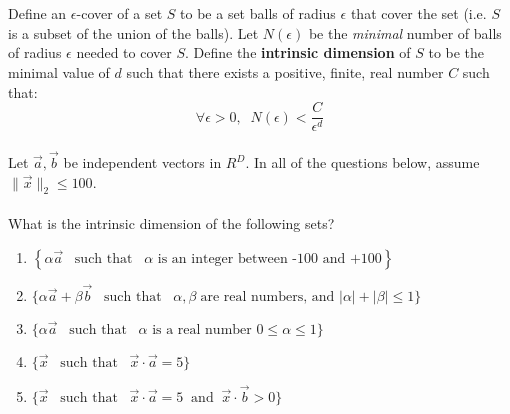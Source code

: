 \documentclass[10pt]{article}
\begin{document}
\newcommand{\uu}{\vec{u}}
\newcommand{\xx}{\vec{x}}
\newcommand{\yy}{\vec{y}}
\newcommand{\vmu}{\vec{\mu}}
~\\
~\\
\noindent
   Define an $\epsilon$-cover of a set
    $S$ to be a set balls of radius $\epsilon$ that
    cover the set (i.e. $S$ is a subset of the union of the
    balls). Let $N(\epsilon)$ be the {\em minimal} number of balls of
    radius $\epsilon$ needed to cover $S$.
    Define the {\bf intrinsic dimension} of $S$ to be the minimal value of
    $d$ such that there exists a positive, finite, real number $C$
    such that:
    $$\forall \epsilon>0, \;\; N(\epsilon)< \frac{C}{\epsilon^d}$$ 
    ~\\
    \newcommand{\vx}{\vec{x}}
    \newcommand{\va}{\vec{a}}
    \newcommand{\vb}{\vec{b}}
    Let $\va,\vb$ be independent vectors in $R^D$. In all of the
    questions below, assume $\|\vx\|_2\leq 100$.\\
    ~\\
    What is the intrinsic dimension of the following sets?
    \begin{enumerate}
    \item $\left\{ \alpha \va \;\;\;\mbox{such that}\;\;\;\alpha
      \mbox{ is an integer between -100 and +100} \right\}$ \underline{\hspace{3.15in}}

    \item $\{\alpha \va + \beta \vb\;\;\;\mbox{such
      that}\;\;\;\alpha,\beta\; \mbox{are real numbers, and }|\alpha|+|\beta| \leq 1\}$  \underline{\hspace{3.15in}}
    \item $\{\alpha \va \;\;\;\mbox{such that}\;\;\; \alpha \mbox{ is
      a real number } 0 \leq \alpha \leq 1 \}$  \underline{\hspace{3.15in}}
    \item $\{\vx\;\;\;\mbox{such that}\;\;\;\vx \cdot \va = 5\}$ \underline{\hspace{3.15in}}
    \item $\{\vx\;\;\;\mbox{such that}\;\;\;\vx \cdot \va = 5
      \;\;\mbox{and}\;\; \vx \cdot \vb > 0\}$ \underline{\hspace{3.15in}}
    \end{enumerate}
\end{document}

